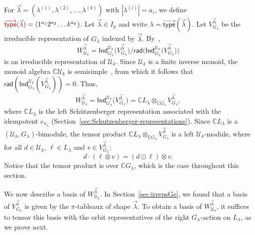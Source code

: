 \documentclass[ALCO,Unicode]{cedram}
\newcommand{\defncolor}{\color{darkred}}
\newcommand{\CC}{\mathbb C}
\newcommand{\vtype}{\overrightarrow{\mathsf{type}}}
\begin{document}
For $\vec{\lambda} = (\lambda^{(1)}, \lambda^{(2)}, \ldots, \lambda^{(k)})$ with $|\lambda^{(i)}|=a_i$,
we define ${\defncolor \vtype(\vec{\lambda})} = (1^{a_1} 2^{a_2} \ldots k^{a_k})$.
Let $\vec{\lambda} \in I_k$ and write $\lambda = \vtype(\vec{\lambda})$.
Let $V_{G_\lambda}^{\vec{\lambda}}$ be the irreducible representation of $G_\lambda$ indexed by $\vec{\lambda}$.
By~\cite[Theorem 5.5]{Steinberg.2016},
\begin{equation*}
    W_{\mathcal{U}_k}^{\vec{\lambda}} = \mathsf{Ind}_{G_\lambda}^{\mathcal{U}_k}\big(V_{G_\lambda}^{\vec{\lambda}}\big) 
    \Big/ \mathsf{rad}\Big(\mathsf{Ind}_{G_\lambda}^{\mathcal{U}_k}\big(V_{G_\lambda}^{\vec{\lambda}}\big)\Big)
\end{equation*}
is an irreducible representation of $\mathcal{U}_k$.
Since $\mathcal{U}_k$ is a finite inverse monoid, the monoid algebra
$\mathbb{C}\mathcal{U}_k$ is semisimple~\cite[Corollary~9.4]{Steinberg.2016},
from which it follows that $\mathsf{rad}(\mathsf{Ind}_{G_\lambda}^{\mathcal{U}_k}(V_{G_\lambda}^{\vec{\lambda}})) = 0$.
Thus,
\begin{equation*}
    W_{\mathcal{U}_k}^{\vec{\lambda}} = \mathsf{Ind}_{G_\lambda}^{\mathcal{U}_k}\big(V_{G_\lambda}^{\vec{\lambda}}\big) 
    = \mathbb{C}L_\lambda \otimes_{\mathbb{C}G_\lambda} V_{G_\lambda}^{\vec{\lambda}},
\end{equation*}
where $\CC L_\lambda$ is the left Sch\"utzenberger representation associated with the idempotent $e_{\pi_\lambda}$
(\cf Section~\ref{sec:Schutzenberger-representations}).
Since $\CC L_\lambda$ is a $(\mathcal{U}_k, G_\lambda)$-bimodule, the tensor product
$\mathbb{C}L_\lambda \otimes_{\mathbb{C}G_\lambda} V_{G_\lambda}^{\vec{\lambda}}$ is a left
$\mathcal{U}_k$-module, where for all $d \in \mathcal{U}_k$, $\ell \in L_\lambda$ and $v \in V_{G_\lambda}^{\vec{\lambda}}$:
\begin{equation}\label{leftaction}
	d \cdot (\ell \otimes v)  = (d \odot \ell) \otimes v.
\end{equation}
Notice that the tensor product is over $\mathbb{C}G_\lambda$, which is the case throughout this section.

We now describe a basis of $W_{\mathcal{U}_k}^{\vec{\lambda}}$.
In Section~\ref{sec:irrepsGe}, we found that a basis of
$V_{G_\lambda}^{\vec{\lambda}}$ is given by the $\pi$-tableaux of shape $\vec{\lambda}$.
To obtain a basis of $W_{\mathcal{U}_k}^{\vec{\lambda}}$, it suffices to tensor this basis with
the orbit representatives of the right $G_\lambda$-action on $L_\lambda$,
as we prove next.
\end{document}
